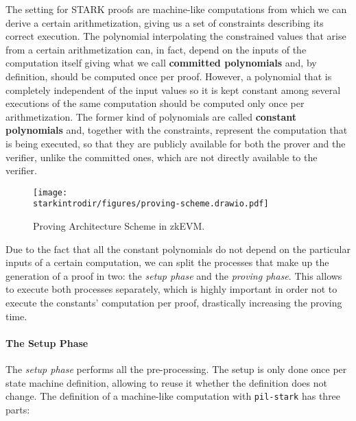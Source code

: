 

The setting for STARK proofs are machine-like computations from which we can derive a certain arithmetization, giving us a set of constraints describing its correct execution. The polynomial interpolating the constrained values that arise from a certain arithmetization can, in fact, depend on the inputs of the computation itself giving what we call \textbf{committed polynomials} and, by definition, should be computed once per proof. However, a polynomial that is completely independent of the input values so it is kept constant among several executions of the same computation should be computed only once per arithmetization. The former kind of polynomials are called \textbf{constant polynomials} and, together with the constraints, represent the computation that is being executed, so that they are publicly available for both the prover and the verifier, unlike the committed ones, which are not directly available to the verifier.

\begin{figure}[H]
\centering
\texttt{[image: \\starkintrodir/figures/proving-scheme.drawio.pdf]}
\caption{Proving Architecture Scheme in zkEVM.}
\label{fig:proving-arch-scheme}
\end{figure}

Due to the fact that all the constant polynomials do not depend on the particular inputs of a certain computation, we can split the processes that make up the generation of a proof in two: the \textit{setup phase} and the \textit{proving phase}. This allows to execute both processes separately, which is highly important in order not to execute the constants' computation per proof, drastically increasing the proving time.

\paragraph*{The Setup Phase}

The \textit{setup phase} performs all the pre-processing. The setup is only done once per state machine definition, allowing to reuse it whether the definition does not change. The definition of a machine-like computation with \texttt{pil-stark} has three parts:

